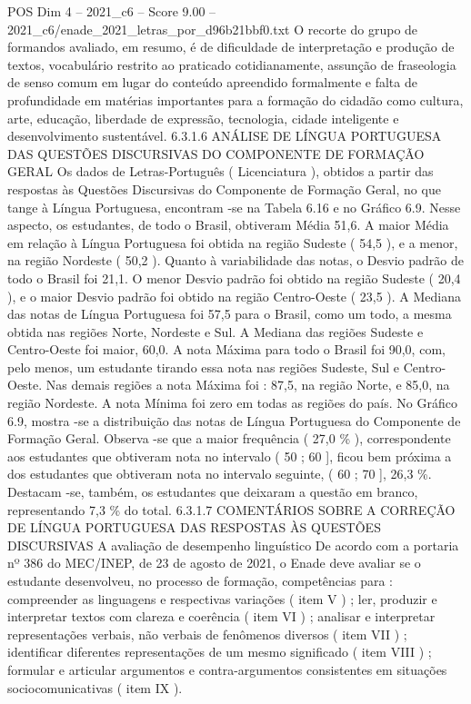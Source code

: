 \begin{textsample}{POS Dim 4 – 2021\_c6 – Score 9.00 – 2021\_c6/enade\_2021\_letras\_por\_d96b21bbf0.txt}
O recorte do grupo de formandos avaliado, em resumo, é de dificuldade de interpretação e produção de textos, vocabulário restrito ao praticado cotidianamente, assunção de fraseologia de senso comum em lugar do conteúdo apreendido formalmente e falta de profundidade em matérias importantes para a formação do cidadão como cultura, arte, educação, liberdade de expressão, tecnologia, cidade inteligente e desenvolvimento sustentável. 6.3.1.6 ANÁLISE DE LÍNGUA PORTUGUESA DAS QUESTÕES DISCURSIVAS DO COMPONENTE DE FORMAÇÃO GERAL Os dados de Letras-Português ( Licenciatura ), obtidos a partir das respostas às Questões Discursivas do Componente de Formação Geral, no que tange à Língua Portuguesa, encontram -se na Tabela 6.16 e no Gráfico 6.9.
Nesse aspecto, os estudantes, de todo o Brasil, obtiveram Média 51,6.
A maior Média em relação à Língua Portuguesa foi obtida na região Sudeste ( 54,5 ), e a menor, na região Nordeste ( 50,2 ).
Quanto à variabilidade das notas, o Desvio padrão de todo o Brasil foi 21,1.
O menor Desvio padrão foi obtido na região Sudeste ( 20,4 ), e o maior Desvio padrão foi obtido na região Centro-Oeste ( 23,5 ).
A Mediana das notas de Língua Portuguesa foi 57,5 para o Brasil, como um todo, a mesma obtida nas regiões Norte, Nordeste e Sul.
A Mediana das regiões Sudeste e Centro-Oeste foi maior, 60,0.
A nota Máxima para todo o Brasil foi 90,0, com, pelo menos, um estudante tirando essa nota nas regiões Sudeste, Sul e Centro-Oeste.
Nas demais regiões a nota Máxima foi : 87,5, na região Norte, e 85,0, na região Nordeste.
A nota Mínima foi zero em todas as regiões do país.
No Gráfico 6.9, mostra -se a distribuição das notas de Língua Portuguesa do Componente de Formação Geral.
Observa -se que a maior frequência ( 27,0 \% ), correspondente aos estudantes que obtiveram nota no intervalo ( 50 ; 60 ], ficou bem próxima a dos estudantes que obtiveram nota no intervalo seguinte, ( 60 ; 70 ], 26,3 \%.
Destacam -se, também, os estudantes que deixaram a questão em branco, representando 7,3 \% do total. 6.3.1.7 COMENTÁRIOS SOBRE A CORREÇÃO DE LÍNGUA PORTUGUESA DAS RESPOSTAS ÀS QUESTÕES DISCURSIVAS A avaliação de desempenho linguístico De acordo com a portaria nº 386 do MEC/INEP, de 23 de agosto de 2021, o Enade deve avaliar se o estudante desenvolveu, no processo de formação, competências para : compreender as linguagens e respectivas variações ( item V ) ; ler, produzir e interpretar textos com clareza e coerência ( item VI ) ; analisar e interpretar representações verbais, não verbais de fenômenos diversos ( item VII ) ; identificar diferentes representações de um mesmo significado ( item VIII ) ; formular e articular argumentos e contra-argumentos consistentes em situações sociocomunicativas ( item IX ).

\end{textsample}
